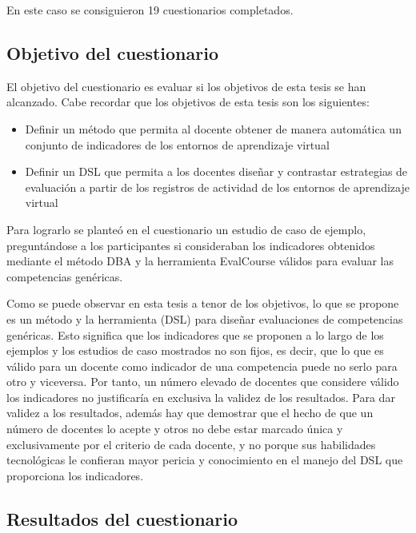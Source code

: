 En este caso se consiguieron 19 cuestionarios completados.

\subsection{Objetivo del cuestionario}

El objetivo del cuestionario es evaluar si los objetivos de esta tesis se han alcanzado. Cabe recordar que los objetivos de esta tesis son los siguientes:

\begin{itemize}
\item Definir un método que permita al docente obtener de manera automática un conjunto de indicadores de los entornos de aprendizaje virtual
\item Definir un DSL que permita a los docentes diseñar y contrastar estrategias de evaluación a partir de los registros de actividad de los entornos de aprendizaje virtual
\end{itemize}

Para lograrlo se planteó en el cuestionario un estudio de caso de ejemplo, preguntándose a los participantes si consideraban los indicadores obtenidos mediante el método DBA y la herramienta EvalCourse válidos para evaluar las competencias genéricas.%

Como se puede observar en esta tesis a tenor de los objetivos, lo que se propone es un método y la herramienta (DSL) para diseñar evaluaciones de competencias genéricas. Esto significa que los indicadores que se proponen a lo largo de los ejemplos y los estudios de caso mostrados no son fijos, es decir, que lo que es válido para un docente como indicador de una competencia puede no serlo para otro y viceversa. Por tanto, un número elevado de docentes que considere válido los indicadores no justificaría en exclusiva la validez de los resultados. Para dar validez a los resultados, además hay que demostrar que el hecho de que un número de docentes lo acepte y otros no debe estar marcado única y exclusivamente por el criterio de cada docente, y no porque sus habilidades tecnológicas le confieran mayor pericia y conocimiento en el manejo del DSL que proporciona los indicadores.


\subsection{Resultados del cuestionario}

